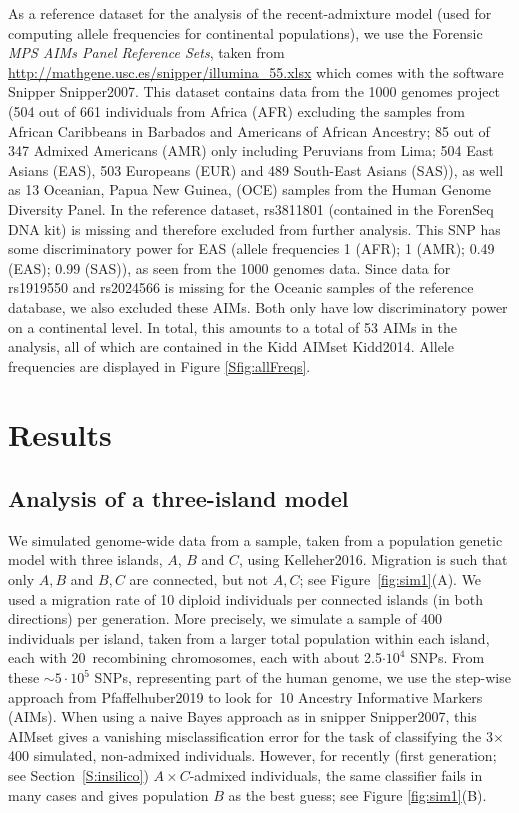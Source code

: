 \documentclass[12pt]{article}
\theoremstyle{definition}
\begin{document}
As a reference dataset for the analysis of the recent-admixture model (used for computing allele frequencies for continental populations), we use the Forensic {\em MPS AIMs Panel Reference Sets}, taken from \url{http://mathgene.usc.es/snipper/illumina_55.xlsx} which comes with the software {\sc Snipper} \cite{article}{Snipper2007}. This dataset contains data from the 1000 genomes project (504 out of 661 individuals from Africa (AFR) excluding the samples from African Caribbeans in Barbados and Americans of African Ancestry; 85 out of 347 Admixed Americans (AMR) only including Peruvians from Lima; 504 East Asians (EAS), 503 Europeans (EUR) and 489 South-East Asians (SAS)), as well as 13 Oceanian, Papua New Guinea, (OCE) samples from the Human Genome Diversity Panel. In the reference dataset, rs3811801 (contained in the ForenSeq DNA kit) is missing and therefore excluded from further analysis. This SNP has some discriminatory power for EAS (allele frequencies 1 (AFR); 1 (AMR); 0.49 (EAS); 0.99 (SAS)), as seen from the 1000 genomes data. Since data for rs1919550 and rs2024566 is missing for the Oceanic samples of the reference database, we also excluded these AIMs. Both only have low discriminatory power on a continental level. In total, this amounts to a total of 53 AIMs in the analysis, all of which are contained in the Kidd AIMset \cite{article}{Kidd2014}. Allele frequencies are displayed in Figure \ref{Sfig:allFreqs}.


\section{Results}

\subsection{{\color{blue} Analysis of a three-island model}}
We simulated genome-wide data from a sample, taken from a population genetic model with three islands, $A$, $B$ and $C$, using \cite{article}{Kelleher2016}. Migration is such that only $A, B$ and $B, C$ are connected, but not $A, C$; see Figure~\ref{fig:sim1}(A). We used a migration rate of 10 diploid individuals per connected islands (in both directions) per generation. More precisely, we simulate a sample of 400 individuals per island{\color{blue}, taken from a larger total population within each island}, each with 20~recombining chromosomes, each with about 2.5$\cdot 10^4$ SNPs. From these $\sim 5\cdot 10^5$ SNPs, {\color{blue} representing part of the human genome,} we use the step-wise approach from \cite{article}{Pfaffelhuber2019} to look for~10 Ancestry Informative Markers (AIMs). When using a naive Bayes approach as in {\sc snipper} \cite{article}{Snipper2007}, this AIMset gives a vanishing misclassification error for the task of classifying the 3$\times$400 simulated, non-admixed individuals. However, {\color{blue} for recently (first generation; see Section~\ref{S:insilico}) $A\times C$-admixed individuals, the same }  classifier fails in many cases and gives population $B$ as the best guess; see Figure \ref{fig:sim1}(B).
\end{document}
